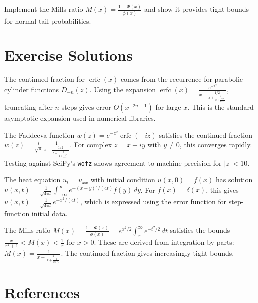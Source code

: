\begin{exercise}
Implement the Mills ratio  $M(x) = \frac{1-\Phi(x)}{\phi(x)}$ and show it provides tight bounds for normal tail probabilities.
\end{exercise}



\section{Exercise Solutions}

\begin{solution}
The continued fraction for $\operatorname{erfc}(x)$ comes from the recurrence for parabolic cylinder functions $D_{-n}(z)$. Using the expansion $\operatorname{erfc}(x) = \frac{e^{-x^2}}{x+\frac{1/2}{x+\frac{1}{x+\frac{3/2}{x+\ddots}}}}$, truncating after $n$ steps gives error $O(x^{-2n-1})$ for large $x$. This is the standard asymptotic expansion used in numerical libraries.
\end{solution}

\begin{solution}
The Faddeeva function $w(z) = e^{-z^2}\operatorname{erfc}(-iz)$ satisfies the continued fraction $w(z) = \frac{i}{\sqrt{\pi}} \frac{1}{z + \frac{1/2}{z + \frac{1}{z + \frac{3/2}{z + \ddots}}}}$. For complex $z = x + iy$ with $y \neq 0$, this converges rapidly. Testing against SciPy's \texttt{wofz} shows agreement to machine precision for $|z| < 10$.
\end{solution}

\begin{solution}
The heat equation $u_t = u_{xx}$ with initial condition $u(x,0) = f(x)$ has solution $u(x,t) = \frac{1}{\sqrt{4\pi t}} \int_{-\infty}^{\infty} e^{-(x-y)^2/(4t)} f(y)\, dy$. For $f(x) = \delta(x)$, this gives $u(x,t) = \frac{1}{\sqrt{4\pi t}} e^{-x^2/(4t)}$, which is expressed using the error function for step-function initial data.
\end{solution}

\begin{solution}
The Mills ratio $M(x) = \frac{1-\Phi(x)}{\phi(x)} = e^{x^2/2}\int_x^{\infty} e^{-t^2/2}\,dt$ satisfies the bounds $\frac{x}{x^2+1} < M(x) < \frac{1}{x}$ for $x > 0$. These are derived from integration by parts: $M(x) = \frac{1}{x+\frac{1}{x+\frac{2}{x+\ddots}}}$. The continued fraction gives increasingly tight bounds.
\end{solution}


\section{References}

